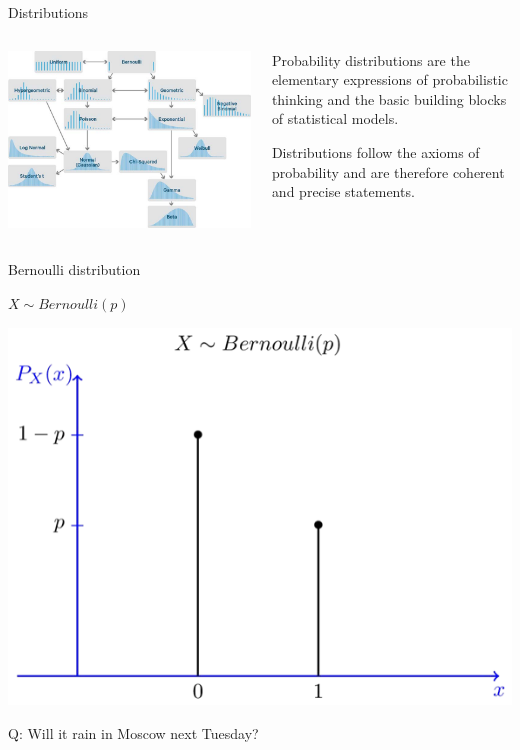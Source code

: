 \begin{frame}{Distributions}

\begin{columns}[c]
\column{3in}
\centering
\includegraphics[width=0.90\linewidth]{../LectureAssets/L01/distributions}

\column{2in}
\begin{small}
\bigskip

Probability distributions are the elementary expressions of probabilistic thinking and
the basic building blocks of statistical models.

\bigskip

\bigskip

Distributions follow the axioms of probability and are therefore coherent and precise statements.

\end{small}

\end{columns}

\bigskip

\end{frame}


\begin{frame}{Bernoulli distribution}
\centering

$X \sim Bernoulli(p)$

\includegraphics[width=0.50\linewidth]{../LectureAssets/L01/dist_C}

\bigskip
\pause
{\color{red} Q:} Will it rain in Moscow next Tuesday?
\bigskip
\end{frame}

